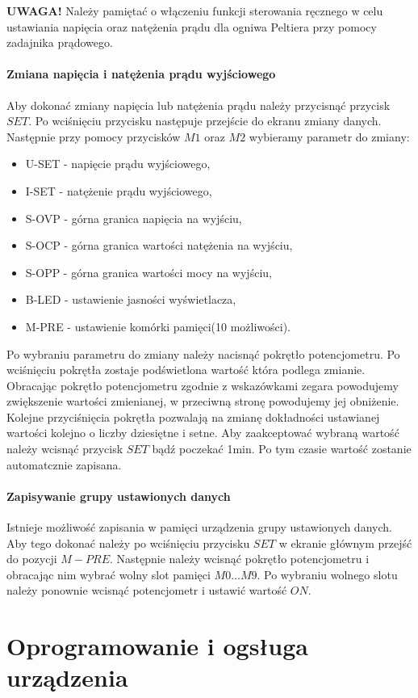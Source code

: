 \documentclass[oneside]{mgr}
\begin{document}
\textbf{UWAGA!} Należy pamiętać o włączeniu funkcji sterowania ręcznego w celu ustawiania napięcia oraz natężenia prądu dla ogniwa Peltiera przy pomocy zadajnika prądowego.
\subsubsection{Zmiana napięcia i natężenia prądu wyjściowego}
Aby dokonać zmiany napięcia lub natężenia prądu należy przycisnąć przycisk $SET$. Po wciśnięciu przycisku następuje przejście do ekranu zmiany danych. Następnie przy pomocy przycisków $M1$ oraz $M2$ wybieramy parametr do zmiany:
\begin{itemize}
    \item U-SET - napięcie prądu wyjściowego,
    \item I-SET - natężenie prądu wyjściowego,
    \item S-OVP - górna granica napięcia na wyjściu,
    \item S-OCP - górna granica wartości natężenia na wyjściu,
    \item S-OPP - górna granica wartości mocy na wyjściu,
    \item B-LED - ustawienie jasności wyświetlacza,
    \item M-PRE - ustawienie komórki pamięci(10 możliwości).
\end{itemize}
Po wybraniu parametru do zmiany należy nacisnąć pokrętło potencjometru. Po wciśnięciu pokrętła zostaje podświetlona wartość która podlega zmianie. Obracając pokrętło potencjometru zgodnie z wskazówkami zegara powodujemy zwiększenie wartości zmienianej, w przeciwną stronę powodujemy jej obniżenie. Kolejne przyciśnięcia pokrętła pozwalają na zmianę dokładności ustawianej wartości kolejno o liczby dziesiętne i setne. Aby zaakceptować wybraną wartość należy wcisnąć przycisk $SET$ bądź poczekać 1min. Po tym czasie wartość zostanie automatcznie zapisana.
\subsubsection{Zapisywanie grupy ustawionych danych}
Istnieje możliwość zapisania w pamięci urządzenia grupy ustawionych danych. Aby tego dokonać należy po wciśnięciu przycisku $SET$ w ekranie głównym przejść do pozycji $M-PRE$. Następnie należy wcisnąć pokrętło potencjometru i obracając nim wybrać wolny slot pamięci $M0\dots M9$. Po wybraniu wolnego slotu należy ponownie wcisnąć potencjometr i ustawić wartość $ON$.

\chapter{Oprogramowanie i ogsługa urządzenia }
\end{document}
